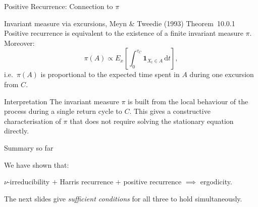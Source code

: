 \documentclass[aspectratio=169]{beamer}
\begin{document}
\begin{frame}{Positive Recurrence: Connection to $\pi$}

  \begin{block}{Invariant measure via excursions, Meyn \& Tweedie
                (1993) Theorem~10.0.1}
    Positive recurrence is equivalent to the existence of a finite
    invariant measure $\pi$. Moreover:
    \[
      \pi(A) \propto E_x\!\left[\int_0^{\tau_C}
      \mathbf{1}_{X_t \in A}\,\mathrm{d}t\right],
    \]
    i.e.\ $\pi(A)$ is proportional to the expected time spent in $A$
    during one excursion from $C$.
  \end{block}

  \bigskip
  \begin{block}{Interpretation}
    The invariant measure $\pi$ is built from the local behaviour of
    the process during a single return cycle to $C$. This gives a
    constructive characterisation of $\pi$ that does not require
    solving the stationary equation directly.
  \end{block}

\end{frame}

\begin{frame}{Summary so far}

  We have shown that:
  \bigskip

  \begin{center}
    $\nu$-irreducibility $+$ Harris recurrence $+$ positive
    recurrence $\implies$ ergodicity.
  \end{center}
  
  \vfill
  The next slides give \emph{sufficient conditions} for all three to hold simultaneously.
  
\end{frame}
\end{document}
